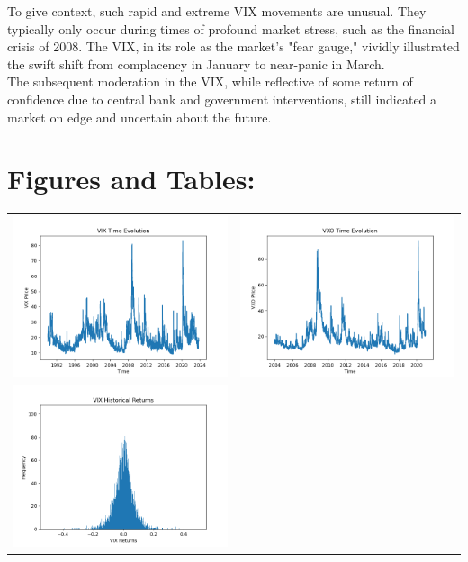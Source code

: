 \documentclass[12pt, a4paper]{article}
\theoremstyle{definition}
\begin{document}
\quad To give context, such rapid and extreme VIX movements are unusual. They typically only occur during times of profound market stress, such as the financial crisis of 2008. The VIX, in its role as the market's "fear gauge," vividly illustrated the swift shift from complacency in January to near-panic in March.
\\

\quad The subsequent moderation in the VIX, while reflective of some return of confidence due to central bank and government interventions, still indicated a market on edge and uncertain about the future. 
\newpage
\section{Figures and Tables:}
\begin{table}[H]
	\centering
	\begin{tabu}to \textwidth {X[c]X[c]}
		\includegraphics[width=75mm]{VIX Time Evolution.png} 
		&\includegraphics[width=75mm]{VXO Time Evolution.png} 
		\\ \includegraphics[width=75mm]{VIX Historical Returns.png} 

\end{tabu}
\end{table}
\end{document}
